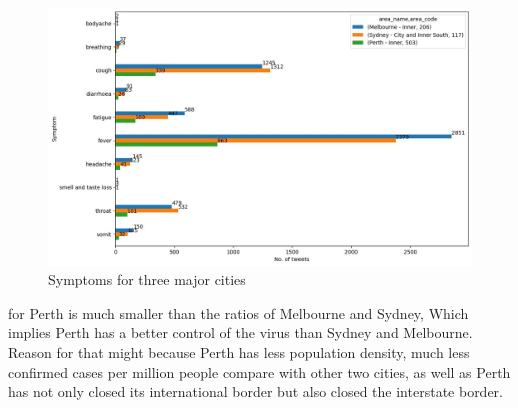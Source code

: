     \begin{figure}[H]
    \centering
    \includegraphics[scale=0.4]{city_analytics/report/images/covid-3-cities.jpeg}
    \caption{Symptoms for three major cities}
    \label{fig:Symptoms for three major cities}
    \end{figure}
    
     for Perth is much smaller than the ratios of Melbourne and Sydney, Which implies Perth has a better control of the virus than Sydney and Melbourne. Reason for that might because Perth has less population density, much less confirmed cases per million people compare with other two cities, as well as Perth has not only closed its international border but also closed the interstate border.
